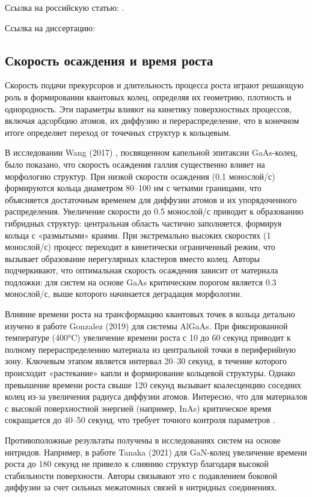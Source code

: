 \documentclass[14pt,oneside]{extarticle}
\begin{document}
Ссылка на российскую статью: \cite{skubachevskii1}.

Ссылка на диссертацию:  \cite{pavlichenko1}

\subsection{Скорость осаждения и время роста}

Скорость подачи прекурсоров и длительность процесса роста играют решающую роль в формировании квантовых колец, определяя их геометрию, плотность и однородность. Эти параметры влияют на кинетику поверхностных процессов, включая адсорбцию атомов, их диффузию и перераспределение, что в конечном итоге определяет переход от точечных структур к кольцевым.

В исследовании Wang (2017) \cite{Wang1}, посвященном капельной эпитаксии GaAs-колец, было показано, что скорость осаждения галлия существенно влияет на морфологию структур. При низкой скорости осаждения (0.1 монослой/с) формируются кольца диаметром 80–100 нм с четкими границами, что объясняется достаточным временем для диффузии атомов и их упорядоченного распределения. Увеличение скорости до 0.5 монослой/с приводит к образованию гибридных структур: центральная область частично заполняется, формируя кольца с «размытыми» краями. При экстремально высоких скоростях (1 монослой/с) процесс переходит в кинетически ограниченный режим, что вызывает образование нерегулярных кластеров вместо колец. Авторы подчеркивают, что оптимальная скорость осаждения зависит от материала подложки: для систем на основе GaAs критическим порогом является 0.3 монослой/с, выше которого начинается деградация морфологии.

Влияние времени роста на трансформацию квантовых точек в кольца детально изучено в работе Gonzalez (2019) 
для системы AlGaAs. При фиксированной температуре (400°C) увеличение времени роста с 10 до 60 секунд приводит к полному перераспределению материала из центральной точки в периферийную зону. Ключевым этапом является интервал 20–30 секунд, в течение которого происходит «растекание» капли и формирование кольцевой структуры. Однако превышение времени роста свыше 120 секунд вызывает коалесценцию соседних колец из-за увеличения радиуса диффузии атомов. Интересно, что для материалов с высокой поверхностной энергией (например, InAs) критическое время сокращается до 40–50 секунд, что требует точного контроля параметров 
.

Противоположные результаты получены в исследованиях систем на основе нитридов. Например, в работе Tanaka (2021) 
для GaN-колец увеличение времени роста до 180 секунд не привело к слиянию структур благодаря высокой стабильности поверхности. Авторы связывают это с подавлением боковой диффузии за счет сильных межатомных связей в нитридных соединениях.
\end{document}
